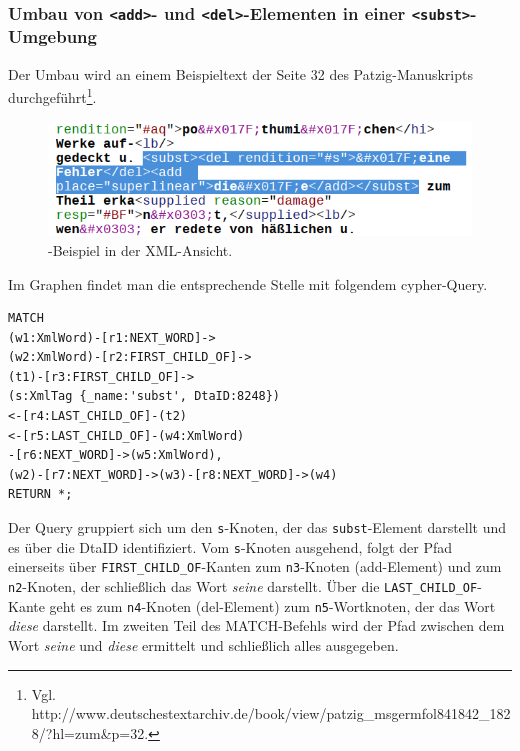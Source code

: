 \documentclass[12pt,ngerman,]{article}
\begin{document}
\subsubsection{\texorpdfstring{Umbau von
\texttt{\textless{}add\textgreater{}}- und
\texttt{\textless{}del\textgreater{}}-Elementen in einer
\texttt{\textless{}subst\textgreater{}}-Umgebung}{Umbau von \textless{}add\textgreater{}- und \textless{}del\textgreater{}-Elementen in einer \textless{}subst\textgreater{}-Umgebung}}\label{umbau-von-add--und-del-elementen-in-einer-subst-umgebung}

Der Umbau wird an einem Beispieltext der Seite 32 des Patzig-Manuskripts
durchgeführt\footnote{Vgl.
  http://www.deutschestextarchiv.de/book/view/patzig\_msgermfol841842\_1828/?hl=zum\&p=32.}.

\begin{figure}
\centering
\includegraphics{Bilder/TEI2Graph/subst-xml-Beispiel.png}
\caption{-Beispiel in der XML-Ansicht.}
\end{figure}

Im Graphen findet man die entsprechende Stelle mit folgendem
cypher-Query.

\begin{verbatim}
MATCH
(w1:XmlWord)-[r1:NEXT_WORD]->
(w2:XmlWord)-[r2:FIRST_CHILD_OF]->
(t1)-[r3:FIRST_CHILD_OF]->
(s:XmlTag {_name:'subst', DtaID:8248})
<-[r4:LAST_CHILD_OF]-(t2)
<-[r5:LAST_CHILD_OF]-(w4:XmlWord)
-[r6:NEXT_WORD]->(w5:XmlWord),
(w2)-[r7:NEXT_WORD]->(w3)-[r8:NEXT_WORD]->(w4)
RETURN *;
\end{verbatim}

Der Query gruppiert sich um den \texttt{s}-Knoten, der das
\texttt{subst}-Element darstellt und es über die DtaID identifiziert.
Vom \texttt{s}-Knoten ausgehend, folgt der Pfad einerseits über
\texttt{FIRST\_CHILD\_OF}-Kanten zum \texttt{n3}-Knoten (add-Element)
und zum \texttt{n2}-Knoten, der schließlich das Wort \emph{seine}
darstellt. Über die \texttt{LAST\_CHILD\_OF}-Kante geht es zum
\texttt{n4}-Knoten (del-Element) zum \texttt{n5}-Wortknoten, der das
Wort \emph{diese} darstellt. Im zweiten Teil des MATCH-Befehls wird der
Pfad zwischen dem Wort \emph{seine} und \emph{diese} ermittelt und
schließlich alles ausgegeben.
\end{document}
